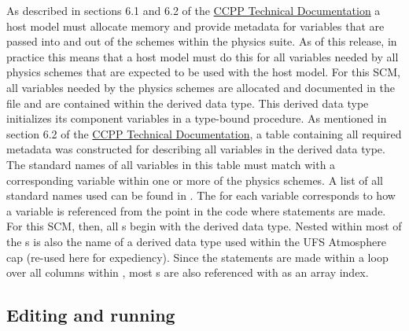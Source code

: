 As described in sections 6.1 and 6.2 of the \href{https://ccpp-techdoc.readthedocs.io/en/v4.1.0/}{CCPP Technical Documentation} a host model must allocate memory and provide metadata for variables that are passed into and out of the schemes within the physics suite. As of this release, in practice this means that a host model must do this for all variables needed by all physics schemes that are expected to be used with the host model. For this SCM, all variables needed by the physics schemes are allocated and documented in the file  and are contained within the  derived data type. This derived data type initializes its component variables in a  type-bound procedure. As mentioned in section 6.2 of the \href{https://ccpp-techdoc.readthedocs.io/en/v4.1.0/}{CCPP Technical Documentation}, a table containing all required metadata was constructed for describing all variables in the  derived data type. The standard names of all variables in this table must match with a corresponding variable within one or more of the physics schemes. A list of all standard names used can be found in . The  for each variable corresponds to how a variable is referenced from the point in the code where  statements are made. For this SCM, then, all s begin with the  derived data type. Nested within most of the s is also the name of a derived data type used within the UFS Atmosphere cap (re-used here for expediency). Since the  statements are made within a loop over all columns within , most s are also referenced with  as an array index.

\subsection{Editing and running }

